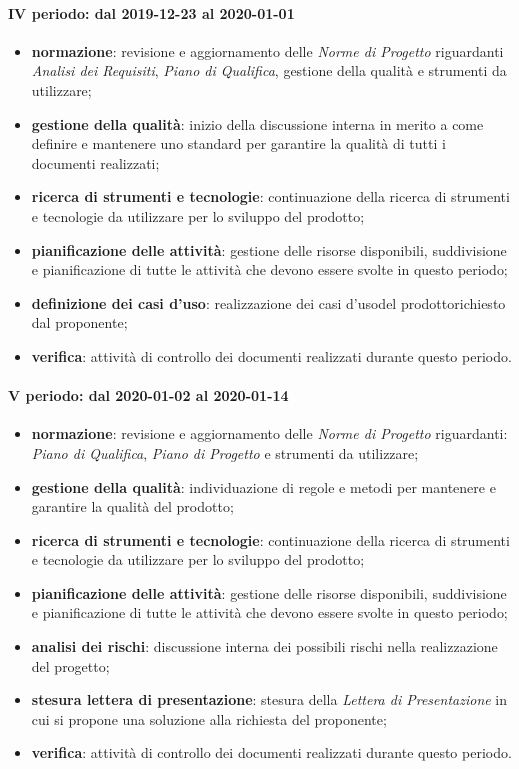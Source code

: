 \paragraph*{IV periodo: dal 2019-12-23 al 2020-01-01}
\begin{itemize}
	\item \textbf{normazione}: revisione e aggiornamento delle \textit{Norme di Progetto} riguardanti \textit{Analisi dei Requisiti}, \textit{Piano di Qualifica}, gestione della qualità e strumenti da utilizzare;
	\item \textbf{gestione della qualità}: inizio della discussione interna in merito a come definire e mantenere uno standard per garantire la qualità di tutti i documenti realizzati;
	\item \textbf{ricerca di strumenti e tecnologie}: continuazione della ricerca di strumenti e tecnologie da utilizzare per lo sviluppo del prodotto\glo;
	\item \textbf{pianificazione delle attività}: gestione delle risorse disponibili, suddivisione e pianificazione di tutte le attività che devono essere svolte in questo periodo;
	\item \textbf{definizione dei casi d'uso}: realizzazione dei casi d'uso\glosp del prodotto\glosp richiesto dal proponente;
	\item \textbf{verifica}: attività di controllo dei documenti realizzati durante questo periodo.
\end{itemize}


\paragraph*{V periodo: dal 2020-01-02 al 2020-01-14}
\begin{itemize}
	\item \textbf{normazione}: revisione e aggiornamento delle \textit{Norme di Progetto} riguardanti: \textit{Piano di Qualifica}, \textit{Piano di Progetto} e strumenti da utilizzare;
	\item \textbf{gestione della qualità}: individuazione di regole e metodi per mantenere e garantire la qualità del prodotto\glo;
	\item \textbf{ricerca di strumenti e tecnologie}: continuazione della ricerca di strumenti e tecnologie da utilizzare per lo sviluppo del prodotto\glo;
	\item \textbf{pianificazione delle attività}: gestione delle risorse disponibili, suddivisione e pianificazione di tutte le attività che devono essere svolte in questo periodo;
	\item \textbf{analisi dei rischi}: discussione interna dei possibili rischi nella realizzazione del progetto\glo;
	\item \textbf{stesura lettera di presentazione}: stesura della \textit{Lettera di Presentazione} in cui si propone una soluzione alla richiesta del proponente;
	\item \textbf{verifica}: attività di controllo dei documenti realizzati durante questo periodo.
\end{itemize}

